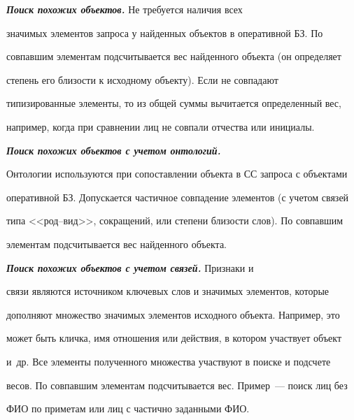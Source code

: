     


    {\bfseries\textit{Поиск похожих объектов.}} Не требуется наличия всех 


значимых элементов запроса у найденных объектов в оперативной БЗ. По 


совпавшим элементам подсчитывается вес найденного объекта (он определяет 


степень его близости к исходному объекту). Если не совпадают 


типизированные элементы, то из общей суммы вычитается определенный вес, 


например, когда при сравнении лиц не совпали отчества или инициалы. 


    


    \smallskip


    


    {\bfseries\textit{Поиск похожих объектов с учетом онтологий.}} 


Онтологии используются при сопоставлении объекта в СС запроса с объектами 


оперативной БЗ. Допускается частичное совпадение элементов (с учетом связей 


типа <<род--вид>>, сокращений, или степени близости слов). По совпавшим 


элементам подсчитывается вес найденного объекта.


    


    \smallskip


    


    {\bfseries\textit{Поиск похожих объектов с учетом связей.}} Признаки и 


связи являются источником ключевых слов и значимых элементов, которые 


дополняют множество значимых элементов исходного объекта. Например, это 


может быть кличка, имя отношения или действия, в котором участвует объект 


и~др. Все элементы полученного множества участвуют в поиске и подсчете 


весов. По совпавшим элементам подсчитывается вес. Пример~--- поиск лиц без 


ФИО по приметам или лиц с частично заданными ФИО.


    


